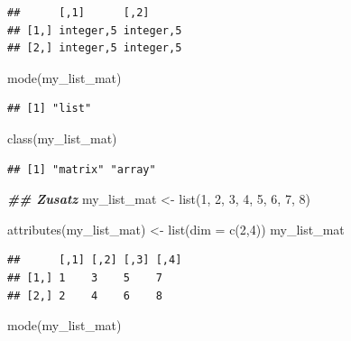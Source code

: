 \documentclass[
]{book}
\newenvironment{Shaded}{\begin{snugshade}}{\end{snugshade}}
\newcommand{\AttributeTok}[1]{\textcolor[rgb]{0.77,0.63,0.00}{#1}}
\newcommand{\DecValTok}[1]{\textcolor[rgb]{0.00,0.00,0.81}{#1}}
\newcommand{\DocumentationTok}[1]{\textcolor[rgb]{0.56,0.35,0.01}{\textbf{\textit{#1}}}}
\newcommand{\FunctionTok}[1]{\textcolor[rgb]{0.00,0.00,0.00}{#1}}
\newcommand{\NormalTok}[1]{#1}
\newcommand{\OtherTok}[1]{\textcolor[rgb]{0.56,0.35,0.01}{#1}}
\begin{document}
\begin{verbatim}
##      [,1]      [,2]     
## [1,] integer,5 integer,5
## [2,] integer,5 integer,5
\end{verbatim}

\begin{Shaded}
\begin{Highlighting}[]
\FunctionTok{mode}\NormalTok{(my\_list\_mat)}
\end{Highlighting}
\end{Shaded}

\begin{verbatim}
## [1] "list"
\end{verbatim}

\begin{Shaded}
\begin{Highlighting}[]
\FunctionTok{class}\NormalTok{(my\_list\_mat)}
\end{Highlighting}
\end{Shaded}

\begin{verbatim}
## [1] "matrix" "array"
\end{verbatim}

\begin{Shaded}
\begin{Highlighting}[]
\DocumentationTok{\#\# Zusatz}
\NormalTok{my\_list\_mat }\OtherTok{\textless{}{-}} \FunctionTok{list}\NormalTok{(}\DecValTok{1}\NormalTok{, }\DecValTok{2}\NormalTok{, }
                    \DecValTok{3}\NormalTok{, }\DecValTok{4}\NormalTok{, }
                    \DecValTok{5}\NormalTok{, }\DecValTok{6}\NormalTok{, }
                    \DecValTok{7}\NormalTok{, }\DecValTok{8}\NormalTok{)}

\FunctionTok{attributes}\NormalTok{(my\_list\_mat) }\OtherTok{\textless{}{-}} \FunctionTok{list}\NormalTok{(}\AttributeTok{dim =} \FunctionTok{c}\NormalTok{(}\DecValTok{2}\NormalTok{,}\DecValTok{4}\NormalTok{))}
\NormalTok{my\_list\_mat}
\end{Highlighting}
\end{Shaded}

\begin{verbatim}
##      [,1] [,2] [,3] [,4]
## [1,] 1    3    5    7   
## [2,] 2    4    6    8
\end{verbatim}

\begin{Shaded}
\begin{Highlighting}[]
\FunctionTok{mode}\NormalTok{(my\_list\_mat)}
\end{Highlighting}
\end{Shaded}
\end{document}
